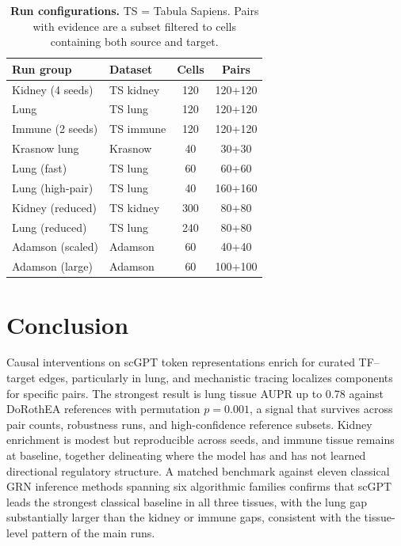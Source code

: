 \documentclass[10pt,letterpaper]{article}
\begin{document}
\begin{table}[!ht]
\centering
\caption{{\bf Run configurations.}
TS = Tabula Sapiens. Pairs with evidence are a subset filtered to cells
containing both source and target.}
\label{tab:run-configs}
\begin{tabular}{llcc}
\toprule
\textbf{Run group} & \textbf{Dataset} & \textbf{Cells} & \textbf{Pairs} \\
\midrule
Kidney (4 seeds) & TS kidney & 120 & 120+120 \\
Lung & TS lung & 120 & 120+120 \\
Immune (2 seeds) & TS immune & 120 & 120+120 \\
Krasnow lung & Krasnow & 40 & 30+30 \\
Lung (fast) & TS lung & 60 & 60+60 \\
Lung (high-pair) & TS lung & 40 & 160+160 \\
Kidney (reduced) & TS kidney & 300 & 80+80 \\
Lung (reduced) & TS lung & 240 & 80+80 \\
Adamson (scaled) & Adamson & 60 & 40+40 \\
Adamson (large) & Adamson & 60 & 100+100 \\
\bottomrule
\end{tabular}
\end{table}


\section*{Conclusion}

Causal interventions on scGPT token representations enrich for curated
TF--target edges, particularly in lung, and mechanistic tracing localizes
components for specific pairs. The strongest result is lung tissue AUPR up to
0.78 against DoRothEA references with permutation $p{=}0.001$, a signal
that survives across pair counts, robustness runs, and high-confidence
reference subsets. Kidney enrichment is modest but reproducible across seeds,
and immune tissue remains at baseline, together delineating where the model
has and has not learned directional regulatory structure. A matched
benchmark against eleven classical GRN inference methods spanning six
algorithmic families confirms that scGPT leads the strongest classical
baseline in all three tissues, with the lung gap substantially larger
than the kidney or immune gaps, consistent with the tissue-level
pattern of the main runs.
\end{document}
